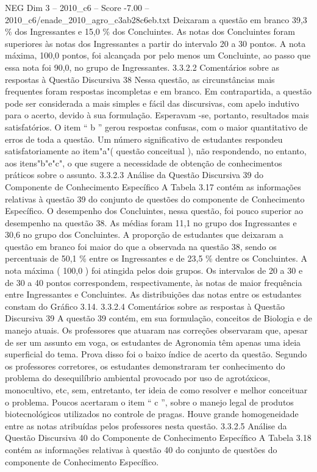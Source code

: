 \begin{textsample}{NEG Dim 3 – 2010\_c6 – Score -7.00 – 2010\_c6/enade\_2010\_agro\_c3ab28c6eb.txt}
Deixaram a questão em branco 39,3 \% dos Ingressantes e 15,0 \% dos Concluintes.
As notas dos Concluintes foram superiores às notas dos Ingressantes a partir do intervalo 20 a 30 pontos.
A nota máxima, 100,0 pontos, foi alcançada por pelo menos um Concluinte, ao passo que essa nota foi 90,0, no grupo de Ingressantes. 3.3.2.2 Comentários sobre as respostas à Questão Discursiva 38 Nessa questão, as circunstâncias mais frequentes foram respostas incompletas e em branco.
Em contrapartida, a questão pode ser considerada a mais simples e fácil das discursivas, com apelo indutivo para o acerto, devido à sua formulação.
Esperavam -se, portanto, resultados mais satisfatórios.
O item “ b ” gerou respostas confusas, com o maior quantitativo de erros de toda a questão.
Um número significativo de estudantes respondeu satisfatoriamente ao item"a"( questão conceitual ), não respondendo, no entanto, aos itens"b"e"c", o que sugere a necessidade de obtenção de conhecimentos práticos sobre o assunto. 3.3.2.3 Análise da Questão Discursiva 39 do Componente de Conhecimento Específico A Tabela 3.17 contém as informações relativas à questão 39 do conjunto de questões do componente de Conhecimento Específico.
O desempenho dos Concluintes, nessa questão, foi pouco superior ao desempenho na questão 38.
As médias foram 11,1 no grupo dos Ingressantes e 30,6 no grupo dos Concluintes.
A proporção de estudantes que deixaram a questão em branco foi maior do que a observada na questão 38, sendo os percentuais de 50,1 \% entre os Ingressantes e de 23,5 \% dentre os Concluintes.
A nota máxima ( 100,0 ) foi atingida pelos dois grupos.
Os intervalos de 20 a 30 e de 30 a 40 pontos correspondem, respectivamente, às notas de maior frequência entre Ingressantes e Concluintes.
As distribuições das notas entre os estudantes constam do Gráfico 3.14. 3.3.2.4 Comentários sobre as respostas à Questão Discursiva 39 A questão 39 contém, em sua formulação, conceitos de Biologia e de manejo atuais.
Os professores que atuaram nas correções observaram que, apesar de ser um assunto em voga, os estudantes de Agronomia têm apenas uma ideia superficial do tema.
Prova disso foi o baixo índice de acerto da questão.
Segundo os professores corretores, os estudantes demonstraram ter conhecimento do problema do desequilíbrio ambiental provocado por uso de agrotóxicos, monocultivo, etc, sem, entretanto, ter ideia de como resolver e melhor conceituar o problema.
Poucos acertaram o item “ c ”, sobre o manejo legal de produtos biotecnológicos utilizados no controle de pragas.
Houve grande homogeneidade entre as notas atribuídas pelos professores nesta questão. 3.3.2.5 Análise da Questão Discursiva 40 do Componente de Conhecimento Específico A Tabela 3.18 contém as informações relativas à questão 40 do conjunto de questões do componente de Conhecimento Específico.

\end{textsample}

